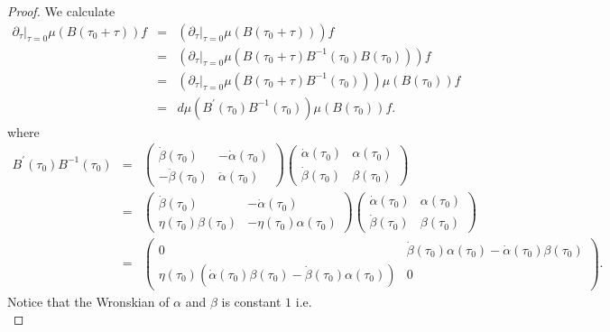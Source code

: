 \documentclass[reqno]{amsart}
\theoremstyle{plain}
\numberwithin{equation}{section}
\begin{document}
\begin{proof}
We calculate\begin{eqnarray*}
\partial _{\tau }|_{\tau =0}\mu \left( B\left( \tau _{0}+\tau \right)
\right) f &=&\left( \partial _{\tau }|_{\tau =0}\mu \left( B\left( \tau
_{0}+\tau \right) \right) \right) f \\
&=&\left( \partial _{\tau }|_{\tau =0}\mu \left( B\left( \tau _{0}+\tau
\right) B^{-1}\left( \tau _{0}\right) B\left( \tau _{0}\right) \right)
\right) f \\
&=&\left( \partial _{\tau }|_{\tau =0}\mu \left( B\left( \tau _{0}+\tau
\right) B^{-1}\left( \tau _{0}\right) \right) \right) \mu \left( B\left(
\tau _{0}\right) \right) f \\
&=&d\mu (B^{\prime }(\tau _{0})B^{-1}\left( \tau _{0}\right) )\mu \left(
B\left( \tau _{0}\right) \right) f.
\end{eqnarray*}where\begin{eqnarray*}
B^{\prime }(\tau _{0})B^{-1}\left( \tau _{0}\right) &=&\begin{pmatrix}
\dot{\beta}(\tau _{0}) & -\dot{\alpha}(\tau _{0}) \\ 
-\ddot{\beta}(\tau _{0}) & \ddot{\alpha}(\tau _{0})\end{pmatrix}\begin{pmatrix}
\dot{\alpha}(\tau _{0}) & \alpha (\tau _{0}) \\ 
\dot{\beta}(\tau _{0}) & \beta (\tau _{0})\end{pmatrix}
\\
&=&\begin{pmatrix}
\dot{\beta}(\tau _{0}) & -\dot{\alpha}(\tau _{0}) \\ 
\eta (\tau _{0})\beta (\tau _{0}) & -\eta (\tau _{0})\alpha (\tau _{0})\end{pmatrix}\begin{pmatrix}
\dot{\alpha}(\tau _{0}) & \alpha (\tau _{0}) \\ 
\dot{\beta}(\tau _{0}) & \beta (\tau _{0})\end{pmatrix}
\\
&=&\begin{pmatrix}
0 & \dot{\beta}(\tau _{0})\alpha (\tau _{0})-\dot{\alpha}(\tau _{0})\beta
(\tau _{0}) \\ 
\eta (\tau _{0})\left( \dot{\alpha}(\tau _{0})\beta (\tau _{0})-\dot{\beta}(\tau _{0})\alpha (\tau _{0})\right) & 0\end{pmatrix}.
\end{eqnarray*}Notice that the Wronskian of $\alpha $ and $\beta $ is constant $1$ i.e.\begin{equation*}

\end{equation*}
\end{proof}
\end{document}
